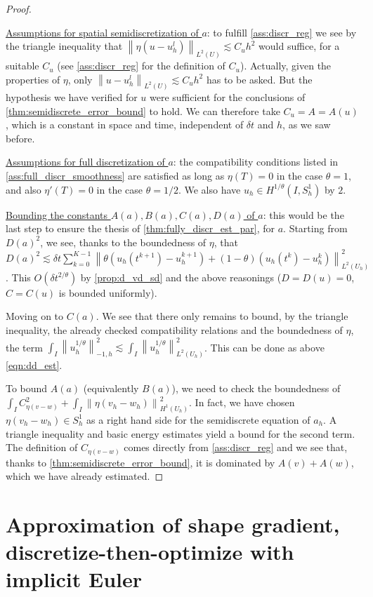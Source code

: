 \documentclass[english,a4paper,9pt,oneside]{scrbook}	%
\theoremstyle{break}
\newenvironment{mproof}[1][\proofname]{%
  \begin{proof}[#1]$ $\par\nobreak\ignorespaces
}{%
  \end{proof}
}
\renewcommand*{\proofname}{Proof}
\theoremstyle{remark}
\newcommand{\ds}{\displaystyle}
\newcommand{\norm}[1]{\left\lVert#1\right\rVert}
\begin{document}
\begin{mproof}
\underline{Assumptions for spatial semidiscretization of $a$}: to fulfill \cref{ass:discr_reg} we see by the triangle inequality that $\norm{\eta(u-u_h^l)}_{L^2(U)}\lesssim C_u h^2$ would suffice, for a suitable $C_u$ (see \cref{ass:discr_reg} for the definition of $C_u$). Actually, given the properties of $\eta$, only $\norm{u-u_h^l}_{L^2(U)}\lesssim C_u h^2$ has to be asked. But the hypothesis we have verified for $u$ were sufficient for the conclusions of \cref{thm:semidiscrete_error_bound} to hold. We can therefore take $C_u = A = A(u)$, which is a constant in space and time, independent of $\delta t$ and $h$, as we saw before.

\underline{Assumptions for full discretization of $a$}: the compatibility conditions listed in \cref{ass:full_discr_smoothness} are satisfied as long as $\eta(T)=0$ in the case $\theta = 1$, and also $\eta'(T)=0$ in the case $\theta=1/2$. We also have $u_h \in H^{1/\theta}(I,S^1_h)$ by $2$.

\underline{Bounding the constants $A(a),B(a),C(a),D(a)$ of $a$}: this would be the last step to ensure the thesis of \cref{thm:fully_discr_est_par}, for $a$. Starting from $D(a)^2$, we see, thanks to the boundedness of $\eta$, that $D(a)^2 \lesssim \delta t \sum_{k=0}^{K-1}\norm{\theta(u_h(t^{k+1})-u_h^{k+1}) + (1-\theta)(u_h(t^k)-u_h^k)}^2_{L^2(U_h)}$. This $O(\delta t^{2/\theta})$ by \cref{prop:d_vd_sd} and the above reasonings ($D=D(u)=0$, $C=C(u)$ is bounded uniformly).

Moving on to $C(a)$. We see that there only remains to bound, by the triangle inequality, the already checked compatibility relations and the boundedness of $\eta$, the term $\ds \int_I\norm{u_h^{1/\theta}}_{-1,h}^2\lesssim \int_I\norm{u_h^{1/\theta}}_{L^2(U_h)}^2$. This can be done as above \cref{eqn:dd_est}.

To bound $A(a)$ (equivalently $B(a)$), we need to check the boundedness of $\ds \int_IC_{\eta(v-w)}^2 + \int_I \norm{\eta(v_h - w_h)}_{H^1(U_h)}^2$. In fact, we have chosen $\eta(v_h - w_h) \in S^1_h$ as a right hand side for the semidiscrete equation of $a_h$. A triangle inequality and basic energy estimates yield a bound for the second term. The definition of $C_{\eta(v-w)}$ comes directly from \cref{ass:discr_reg} and we see that, thanks to \cref{thm:semidiscrete_error_bound}, it is dominated by $A(v)+A(w)$, which we have already estimated.
\end{mproof}

\section{Approximation of shape gradient, discretize-then-optimize with implicit Euler}
\label{sec:d-t-o_IE}
\end{document}
